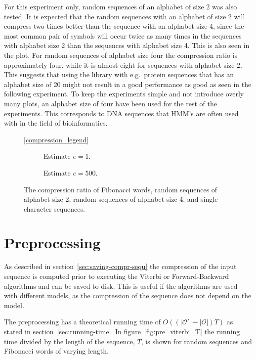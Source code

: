For this experiment only, random sequences of an alphabet of size 2 was also
tested. It is expected that the random sequences with an alphabet of size 2
will compress two times better than the sequence with an alphabet size 4, since
the most common pair of symbols will occur twice as many times in the sequences
with alphabet size 2 than the sequences with alphabet size 4. This is also seen
in the plot. For random sequences of alphabet size four the compression ratio
is approximately four, while it is almost eight for sequences with alphabet
size 2. This suggests that using the library with e.g.\ protein sequences that
has an alphabet size of 20 might not result in a good performance as good as seen
in the following experiment. To keep the experiments simple and not introduce
overly many plots, an alphabet size of four have been used for the rest of the
experiments. This corresponds to DNA sequences that HMM's are often used with
in the field of bioinformatics.

\begin{figure}
  \centering\ref{compression_legend}
  \begin{subfigure}[b]{0.5\textwidth}
    \centering 
    \caption{Estimate $e = 1$.}
  \end{subfigure}%
  \begin{subfigure}[b]{0.5\textwidth}
    \centering 
    \caption{Estimate $e = 500$.}
  \end{subfigure}
  \caption{The compression ratio of Fibonacci words, random sequences of
    alphabet size 2, random sequences of alphabet size 4, and single character
    sequences.}
  \label{fig:compression_ratio}
\end{figure}

\section{Preprocessing}

As described in section~\ref{sec:saving-compr-sequ} the compression of the
input sequence is computed prior to executing the Viterbi or Forward-Backward
algorithms and can be saved to disk. This is useful if the algorithms are used with different
models, as the compression of the sequence does not depend on the model.

The preprocessing has a theoretical running time of
$O(( \lvert\mathcal{O'}\rvert - \lvert{\mathcal{O}}\rvert) T)$ as stated in
section~\ref{sec:running-time}. In figure~\ref{fig:pre_viterbi_T} the running
time divided by the length of the sequence, $T$, is shown for random sequences
and Fibonacci words of varying length.

